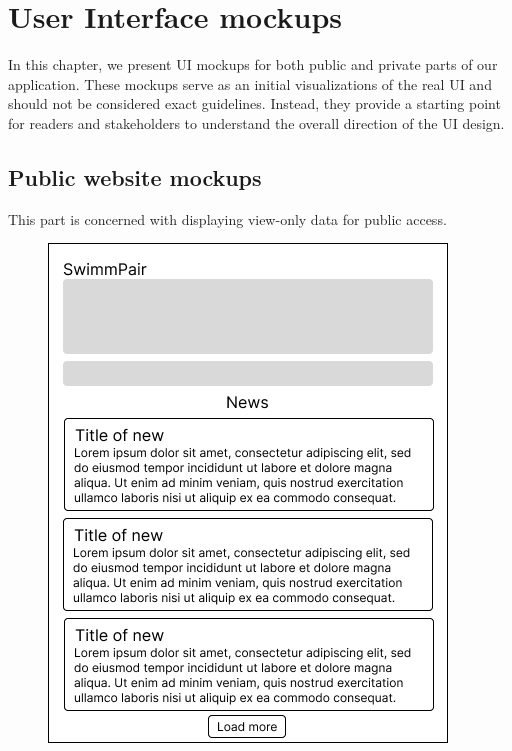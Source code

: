 \section{User Interface mockups}
In this chapter, we present UI mockups for both public and private parts of our application. These mockups serve as an initial visualizations of the real UI and should not be considered exact guidelines. Instead, they provide a starting point for readers and stakeholders to understand the overall direction of the UI design.
\subsection*{Public website mockups}
This part is concerned with displaying view-only data for public access.
\begin{figure}[h]	
	\centering	
    \includegraphics[scale=0.457]{img/def-U-Main.png}

\end{figure}
